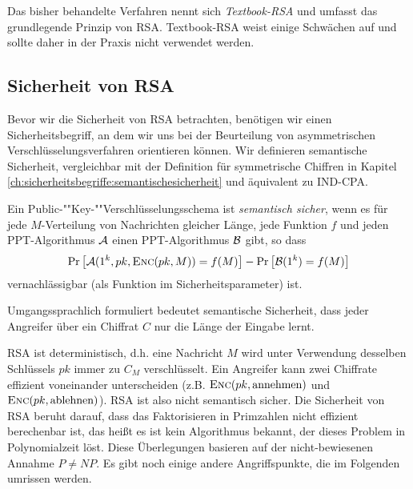 Das bisher behandelte Verfahren nennt sich \textit{Textbook-RSA} und umfasst das grundlegende Prinzip von RSA. Textbook-RSA weist einige Schwächen auf und sollte daher in der Praxis nicht verwendet werden.

\subsection{Sicherheit von RSA}
\label{ch:asymmenc:rsa:sicherheit}
Bevor wir die Sicherheit von RSA betrachten, benötigen wir einen Sicherheitsbegriff, an dem wir uns bei der Beurteilung von asymmetrischen
Verschlüsselungsverfahren orientieren können. Wir definieren semantische Sicherheit, vergleichbar mit der Definition für symmetrische Chiffren in Kapitel \ref{ch:sicherheitsbegriffe:semantischesicherheit} und äquivalent zu IND-CPA.
\begin{definition}
Ein Pub\-lic-""Key-""Ver\-schlüs\-sel\-ungs\-sche\-ma ist \textit{semantisch sicher}, wenn es für jede $M$-Verteilung von Nachrichten gleicher Länge, jede
Funktion $f$ und jeden PPT-Algorithmus $\mathcal{A}$ einen PPT-Algorithmus $\mathcal{B}$ gibt, so dass
\begin{equation*}
\Pr\left[\mathcal{A}(1^k, pk, \textsc{Enc}(pk, M)) = f(M)\right] - \Pr\left[\mathcal{B}(1^k) = f(M)\right]
\end{equation*}
vernachlässigbar (als Funktion im Sicherheitsparameter) ist.
\end{definition} 

Umgangssprachlich formuliert bedeutet semantische Sicherheit, dass jeder Angreifer über ein Chiffrat $C$ nur die Länge der Eingabe lernt.

RSA ist deterministisch, d.h. eine Nachricht $M$ wird unter Verwendung desselben Schlüssels $pk$ immer zu $C_M$ verschlüsselt. Ein Angreifer kann zwei Chiffrate effizient voneinander unterscheiden (z.B. $\textsc{Enc}(pk, \text{annehmen})$ und $\textsc{Enc}(pk, \text{ablehnen})$). RSA ist also nicht semantisch sicher. Die Sicherheit von RSA beruht darauf, dass das Faktorisieren in Primzahlen nicht effizient berechenbar ist, das heißt es ist kein Algorithmus bekannt, der dieses Problem in Polynomialzeit löst. Diese Überlegungen basieren auf der nicht-bewiesenen Annahme $P \neq NP$.
Es gibt noch einige andere Angriffspunkte, die im Folgenden umrissen werden.

